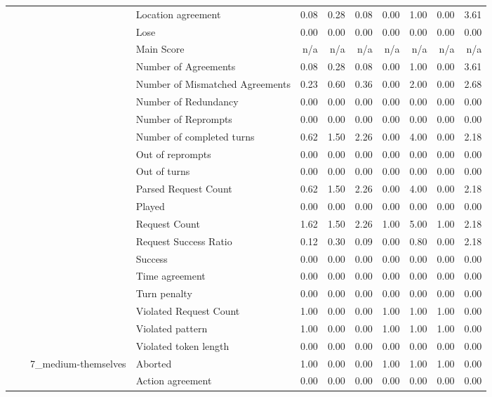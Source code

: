\begin{tabular}{llllrrrrrrr}
 &  &  & Location agreement & 0.08 & 0.28 & 0.08 & 0.00 & 1.00 & 0.00 & 3.61 \\
 &  &  & Lose & 0.00 & 0.00 & 0.00 & 0.00 & 0.00 & 0.00 & 0.00 \\
 &  &  & Main Score & n/a & n/a & n/a & n/a & n/a & n/a & n/a \\
 &  &  & Number of Agreements & 0.08 & 0.28 & 0.08 & 0.00 & 1.00 & 0.00 & 3.61 \\
 &  &  & Number of Mismatched Agreements & 0.23 & 0.60 & 0.36 & 0.00 & 2.00 & 0.00 & 2.68 \\
 &  &  & Number of Redundancy & 0.00 & 0.00 & 0.00 & 0.00 & 0.00 & 0.00 & 0.00 \\
 &  &  & Number of Reprompts & 0.00 & 0.00 & 0.00 & 0.00 & 0.00 & 0.00 & 0.00 \\
 &  &  & Number of completed turns & 0.62 & 1.50 & 2.26 & 0.00 & 4.00 & 0.00 & 2.18 \\
 &  &  & Out of reprompts & 0.00 & 0.00 & 0.00 & 0.00 & 0.00 & 0.00 & 0.00 \\
 &  &  & Out of turns & 0.00 & 0.00 & 0.00 & 0.00 & 0.00 & 0.00 & 0.00 \\
 &  &  & Parsed Request Count & 0.62 & 1.50 & 2.26 & 0.00 & 4.00 & 0.00 & 2.18 \\
 &  &  & Played & 0.00 & 0.00 & 0.00 & 0.00 & 0.00 & 0.00 & 0.00 \\
 &  &  & Request Count & 1.62 & 1.50 & 2.26 & 1.00 & 5.00 & 1.00 & 2.18 \\
 &  &  & Request Success Ratio & 0.12 & 0.30 & 0.09 & 0.00 & 0.80 & 0.00 & 2.18 \\
 &  &  & Success & 0.00 & 0.00 & 0.00 & 0.00 & 0.00 & 0.00 & 0.00 \\
 &  &  & Time agreement & 0.00 & 0.00 & 0.00 & 0.00 & 0.00 & 0.00 & 0.00 \\
 &  &  & Turn penalty & 0.00 & 0.00 & 0.00 & 0.00 & 0.00 & 0.00 & 0.00 \\
 &  &  & Violated Request Count & 1.00 & 0.00 & 0.00 & 1.00 & 1.00 & 1.00 & 0.00 \\
 &  &  & Violated pattern & 1.00 & 0.00 & 0.00 & 1.00 & 1.00 & 1.00 & 0.00 \\
 &  &  & Violated token length & 0.00 & 0.00 & 0.00 & 0.00 & 0.00 & 0.00 & 0.00 \\
\cline{3-11}
 &  & \multirow[t]{27}{*}{7_medium-themselves} & Aborted & 1.00 & 0.00 & 0.00 & 1.00 & 1.00 & 1.00 & 0.00 \\
 &  &  & Action agreement & 0.00 & 0.00 & 0.00 & 0.00 & 0.00 & 0.00 & 0.00 \\

\end{tabular}
